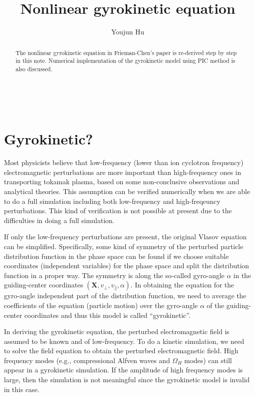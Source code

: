 \documentclass{llncs}
\begin{document}
\

\title{Nonlinear gyrokinetic equation}

\author{Youjun Hu}


\maketitle

\begin{abstract}
  The nonlinear gyrokinetic equation in Frieman-Chen's
  paper{\cite{frieman1982}} is re-derived step by step in this note. Numerical
  implementation of the gyrokinetic model using PIC method is also discussed.
\end{abstract}

\section{Gyrokinetic?}

Most physicists believe that low-frequency (lower than ion cyclotron
frequency) electromagnetic perturbations are more important than
high-frequency ones in transporting tokamak plasma, based on some
non-conclusive observations and analytical theories. This assumption can be
verified numerically when we are able to do a full simulation including both
low-frequency and high-freqeuncy perturbations. This kind of verification is
not possible at present due to the difficulties in doing a full simulation.

If only the low-frequency perturbations are present, the original Vlasov
equation can be simplified. Specifically, some kind of symmetry of the
perturbed particle distribution function in the phase space can be found if we
choose suitable coordinates (independent variables) for the phase space and
split the distribution function in a proper way. The symmetry is along the
so-called gyro-angle $\alpha$ in the guiding-center coordinates $(\mathbf{X},
v_{\perp}, v_{\parallel}, \alpha)$. In obtaining the equation for the
gyro-angle independent part of the distribution function, we need to average
the coefficients of the equation (particle motion) over the gyro-angle
$\alpha$ of the guiding-center coordinates and thus this model is called
``gyrokinetic''.

In deriving the gyrokinetic equation, the perturbed electromagnetic field is
assumed to be known and of low-frequency. To do a kinetic simulation, we need
to solve the field equation to obtain the perturbed electromagnetic field.
High frequency modes (e.g., compressional Alfven waves and $\Omega_H$ modes)
can still appear in a gyrokinetic simulation. If the amplitude of high
frequency modes is large, then the simulation is not meaningful since the
gyrokinetic model is invalid in this case.
\end{document}
